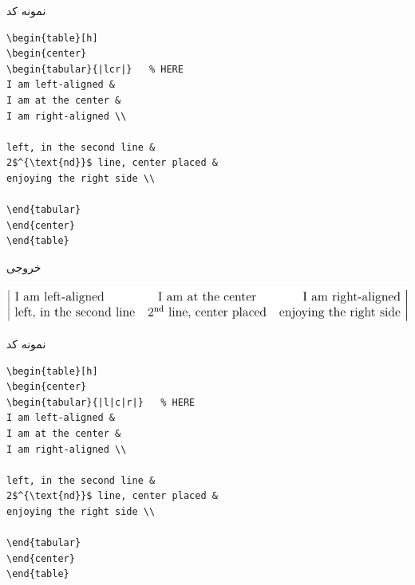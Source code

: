 \begin{frame}[fragile]{نمونه کد}
\begin{latin}
\begin{lstlisting}[keywords={begin, end}, keywordstyle=\color{Mulberry}\textbf]
\begin{table}[h]
\begin{center}
\begin{tabular}{|lcr|}   % HERE
I am left-aligned & 
I am at the center & 
I am right-aligned \\

left, in the second line &
2$^{\text{nd}}$ line, center placed &
enjoying the right side \\

\end{tabular}
\end{center}
\end{table}
\end{lstlisting}
\end{latin}
\end{frame}

\begin{frame}{خروجی}
\begin{center}
\includegraphics[width=\textwidth]{docs/images/2}
\end{center}
\end{frame}

\begin{frame}[fragile]{نمونه کد}
\begin{latin}
\begin{lstlisting}[keywords={begin, end}, keywordstyle=\color{Mulberry}\textbf]
\begin{table}[h]
\begin{center}
\begin{tabular}{|l|c|r|}   % HERE
I am left-aligned & 
I am at the center & 
I am right-aligned \\

left, in the second line &
2$^{\text{nd}}$ line, center placed &
enjoying the right side \\

\end{tabular}
\end{center}
\end{table}
\end{lstlisting}
\end{latin}
\end{frame}

